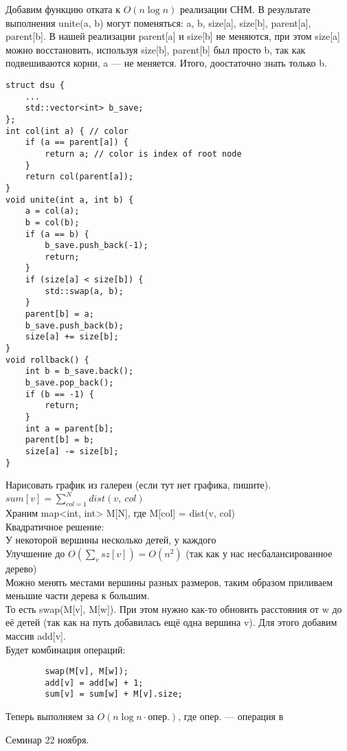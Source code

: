 \documentclass[12pt, a4paper]{article}
\begin{document}
    \newpage
    Добавим функцию отката к $O(n\log n)$ реализации СНМ. В результате выполнения unite(a, b) могут поменяться: a, b, size[a], size[b], parent[a], parent[b]. В нашей реализации parent[a] и size[b] не меняются, при этом size[a] можно восстановить, используя size[b], parent[b] был просто b, так как подвешиваются корни, a --- не меняется. Итого, доостаточно знать только b.
    \begin{lstlisting}
struct dsu {
    ...
    std::vector<int> b_save;
};
int col(int a) { // color
    if (a == parent[a]) {
        return a; // color is index of root node
    }
    return col(parent[a]);
}
void unite(int a, int b) {
    a = col(a);
    b = col(b);
    if (a == b) {
        b_save.push_back(-1);
        return;
    }
    if (size[a] < size[b]) {
        std::swap(a, b);
    }
    parent[b] = a;
    b_save.push_back(b);
    size[a] += size[b];
}
void rollback() {
    int b = b_save.back();
    b_save.pop_back();
    if (b == -1) {
        return;
    }
    int a = parent[b];
    parent[b] = b;
    size[a] -= size[b];
}
    \end{lstlisting}
    \newpage
    Нарисовать график из галереи (если тут нет графика, пишите).\\
    $\displaystyle sum[v] = \sum_{col = 1}^{N} dist(v,\ col)$\\
    Храним map<int, int> M[N], где M[col] = dist(v, col)\\
    Квадратичное решение:\\
    У некоторой вершины несколько детей, у каждого \\
    Улучшение до $O\left(\displaystyle\sum_v sz[v]\right) = O(n^2)$ (так как у нас несбалансированное дерево)\\
    Можно менять местами вершины разных размеров, таким образом приливаем меньшие части дерева к большим.\\
    То есть swap(M[v], M[w]). При этом нужно как-то обновить расстояния от w до её детей (так как на путь добавилась ещё одна вершина v). Для этого добавим массив add[v].\\
    Будет комбинация операций:
    \begin{lstlisting}
        swap(M[v], M[w]);
        add[v] = add[w] + 1;
        sum[v] = sum[w] + M[v].size;
    \end{lstlisting}
    Теперь выполняем за $O(n\log n \cdot \text{опер.})$, где опер. --- операция в 
    \begin{center}
        Семинар 22 ноября.
    \end{center}
\end{document}
